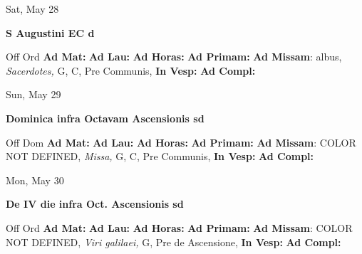 \documentclass[10pt]{book}
\begin{document}
\begin{center}
\begin{minipage}{3.5in}
\vspace{2em}
\begin{center}Sat, May 28
\end{center}
\textbf{ \large S Augustini EC
\textnormal{\normalsize d}}

\begin{justify}Off Ord
\textbf{Ad Mat: }
\textbf{Ad Lau: }
\textbf{Ad Horas: }
\textbf{Ad Primam: }\textbf{Ad Missam}: albus, \textit{Sacerdotes,} G, C, Pre Communis, 
\textbf{In Vesp: }
\textbf{Ad Compl: }
\end{justify}
\end{minipage}
\end{center}

\begin{center}
\begin{minipage}{3.5in}
\vspace{2em}
\begin{center}Sun, May 29
\end{center}
\textbf{ \large Dominica infra Octavam Ascensionis
\textnormal{\normalsize sd}}

\begin{justify}Off Dom
\textbf{Ad Mat: }
\textbf{Ad Lau: }
\textbf{Ad Horas: }
\textbf{Ad Primam: }\textbf{Ad Missam}: COLOR NOT DEFINED, \textit{Missa,} G, C, Pre Communis, 
\textbf{In Vesp: }
\textbf{Ad Compl: }
\end{justify}
\end{minipage}
\end{center}

\begin{center}
\begin{minipage}{3.5in}
\vspace{2em}
\begin{center}Mon, May 30
\end{center}
\textbf{ \large De IV die infra Oct. Ascensionis
\textnormal{\normalsize sd}}

\begin{justify}Off Ord
\textbf{Ad Mat: }
\textbf{Ad Lau: }
\textbf{Ad Horas: }
\textbf{Ad Primam: }\textbf{Ad Missam}: COLOR NOT DEFINED, \textit{Viri galilaei,} G, Pre de Ascensione, 
\textbf{In Vesp: }
\textbf{Ad Compl: }
\end{justify}
\end{minipage}
\end{center}
\end{document}
